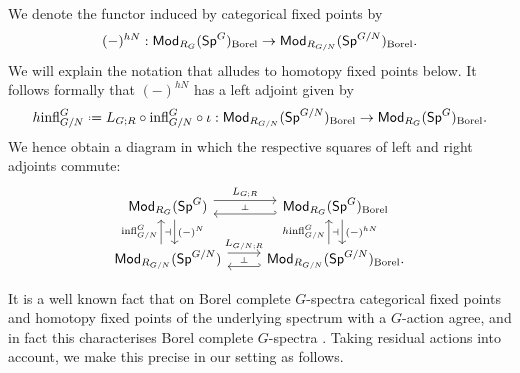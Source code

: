 \documentclass[reqno]{amsart}
\numberwithin{equation}{section}\theoremstyle{thms}
\theoremstyle{defn}
\newcommand{\tn}[1]{\textnormal{#1}}
\newcommand{\tsf}[1]{\textsf{\textup{#1}}}
\newcommand*{\defeq}{\mathrel{\vcenter{\baselineskip0.4ex \lineskiplimit0pt
\hbox{\scriptsize.}\hbox{\scriptsize.}}}%
=}
\newcommand{\Mod}{\tsf{Mod}}
\newcommand{\spec}{\tsf{Sp}}
\newcommand{\specg}{\tsf{Sp}^G}
\begin{document}
We denote the functor induced by categorical fixed points by
$$(-)^{hN}:\Mod_{R_G}(\specg)_{\tn{Borel}} \to \Mod_{R_{G/N}}(\spec^{G/N})_{\tn{Borel}}.$$ 
We will explain the notation that alludes to homotopy fixed points below. It follows formally that $(-)^{hN}$ has a left adjoint given by 
$$h\tn{infl}^G_{G/N} \defeq L_{G;R}\circ \tn{infl}^G_{G/N}\circ \iota: \Mod_{R_{G/N}}(\spec^{G/N})_{\tn{Borel}} \to \Mod_{R_G}(\specg)_{\tn{Borel}}.$$
We hence obtain a diagram in which the respective squares of left and right adjoints commute:
\begin{equation}\label{diag:fixedpointsinflationborel}
\begin{tikzcd}
	{\Mod_{R_G}(\specg)} & {\Mod_{R_G}(\specg)_{\tn{Borel}}} \\
	{\Mod_{R_{G/N}}(\spec^{G/N})} & {\Mod_{R_{G/N}}(\spec^{G/N})_{\tn{Borel}}.}
	\arrow[""{name=0, anchor=center, inner sep=0}, "{L_{G;R}}", shift left=2, from=1-1, to=1-2]
	\arrow[""{name=1, anchor=center, inner sep=0}, "{(-)^N}", shift left=2, from=1-1, to=2-1]
	\arrow[""{name=2, anchor=center, inner sep=0}, shift left=2, hook', from=1-2, to=1-1]
	\arrow[""{name=3, anchor=center, inner sep=0}, "{(-)^{hN}}", shift left=2, from=1-2, to=2-2]
	\arrow[""{name=4, anchor=center, inner sep=0}, "{\tn{infl}^G_{G/N}}", shift left=2, from=2-1, to=1-1]
	\arrow[""{name=5, anchor=center, inner sep=0}, "{L_{G/N;R}}", shift left=2, from=2-1, to=2-2]
	\arrow[""{name=6, anchor=center, inner sep=0}, "{h\tn{infl}^G_{G/N}}", shift left=2, from=2-2, to=1-2]
	\arrow[""{name=7, anchor=center, inner sep=0}, shift left=2, hook', from=2-2, to=2-1]
	\arrow["\dashv"{anchor=center, rotate=-90}, draw=none, from=0, to=2]
	\arrow["\dashv"{anchor=center, rotate=-90}, draw=none, from=5, to=7]
	\arrow["\dashv"{anchor=center}, draw=none, from=4, to=1]
	\arrow["\dashv"{anchor=center}, draw=none, from=6, to=3]
\end{tikzcd}
\end{equation}

It is a well known fact that on Borel complete $G$-spectra categorical fixed points and homotopy fixed points of the underlying spectrum with a $G$-action agree, and in fact this characterises Borel complete $G$-spectra \cite[Proposition 6.19]{mnn17}. Taking residual actions into account, we make this precise in our setting as follows.
\end{document}
